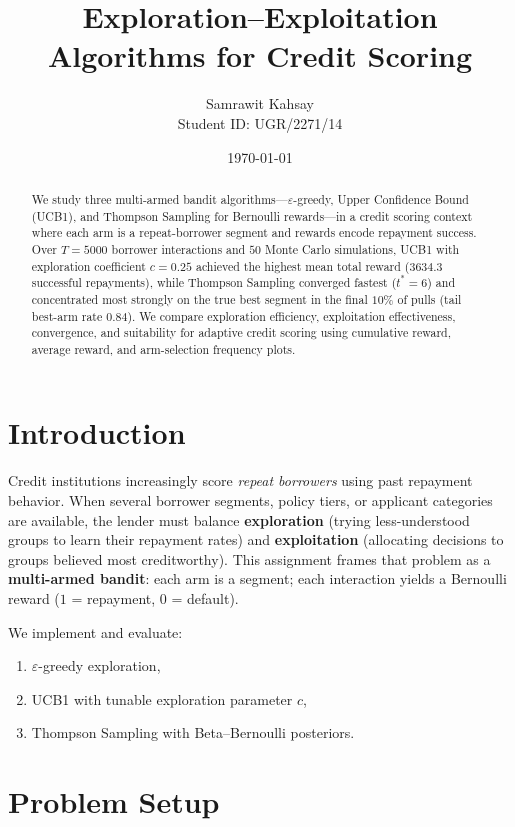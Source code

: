 \documentclass[11pt,a4paper]{article}
\title{Exploration--Exploitation Algorithms for Credit Scoring}
\author{Samrawit Kahsay\\Student ID: UGR/2271/14}
\date{\today}
\begin{document}
\maketitle

\begin{abstract}
We study three multi-armed bandit algorithms---$\varepsilon$-greedy, Upper Confidence Bound (UCB1), and Thompson Sampling for Bernoulli rewards---in a credit scoring context where each arm is a repeat-borrower segment and rewards encode repayment success. Over $T{=}5000$ borrower interactions and $50$ Monte Carlo simulations, UCB1 with exploration coefficient $c{=}0.25$ achieved the highest mean total reward ($3634.3$ successful repayments), while Thompson Sampling converged fastest ($t^\ast{=}6$) and concentrated most strongly on the true best segment in the final $10\%$ of pulls (tail best-arm rate $0.84$). We compare exploration efficiency, exploitation effectiveness, convergence, and suitability for adaptive credit scoring using cumulative reward, average reward, and arm-selection frequency plots.
\end{abstract}

\section{Introduction}

Credit institutions increasingly score \emph{repeat borrowers} using past repayment behavior. When several borrower segments, policy tiers, or applicant categories are available, the lender must balance \textbf{exploration} (trying less-understood groups to learn their repayment rates) and \textbf{exploitation} (allocating decisions to groups believed most creditworthy). This assignment frames that problem as a \textbf{multi-armed bandit}: each arm is a segment; each interaction yields a Bernoulli reward ($1$ = repayment, $0$ = default).

We implement and evaluate:
\begin{enumerate}[noitemsep]
  \item $\varepsilon$-greedy exploration,
  \item UCB1 with tunable exploration parameter $c$,
  \item Thompson Sampling with Beta--Bernoulli posteriors.
\end{enumerate}

\section{Problem Setup}
\end{document}

